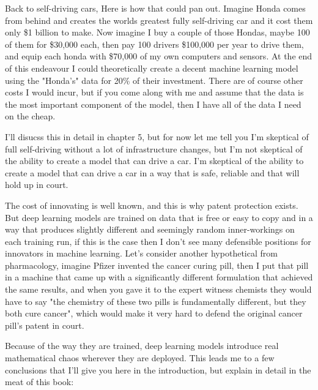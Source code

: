 Back to self-driving cars, Here is how that could pan out. Imagine Honda comes from behind and creates the worlds greatest fully self-driving car and it cost them only \$1 billion to make. Now imagine I buy a couple of those Hondas, maybe 100 of them for \$30,000 each, then pay 100 drivers \$100,000 per year to drive them, and equip each honda with \$70,000 of my own computers and sensors. At the end of this endeavour I could theoretically create a decent machine learning model using the "Honda's" data for 20\% of their investment. There are of course other costs I would incur, but if you come along with me and assume that the data is the most important component of the model, then I have all of the data I need on the cheap.

I'll disucss this in detail in chapter 5, but for now let me tell you I'm skeptical of full self-driving without a lot of infrastructure changes, but I'm not skeptical of the ability to create a model that can drive a car. I'm skeptical of the ability to create a model that can drive a car in a way that is safe, reliable and that will hold up in court.   

The cost of innovating is well known, and this is why patent protection exists. But deep learning models are trained on data that is free or easy to copy and in a way that produces slightly different and seemingly random inner-workings on each training run, if this is the case then I don't see many defensible positions for innovators in machine learning. Let's consider another hypothetical from pharmacology, imagine Pfizer invented the cancer curing pill, then I put that pill in a machine that came up with a significantly different formulation that achieved the same results, and when you gave it to the expert witness chemists they would have to say "the chemistry of these two pills is fundamentally different, but they both cure cancer", which would make it very hard to defend the original cancer pill's patent in court.

Because of the way they are trained, deep learning models introduce real mathematical chaos wherever they are deployed. This leads me to a few conclusions that I'll give you here in the introduction, but explain in detail in the meat of this book: 

